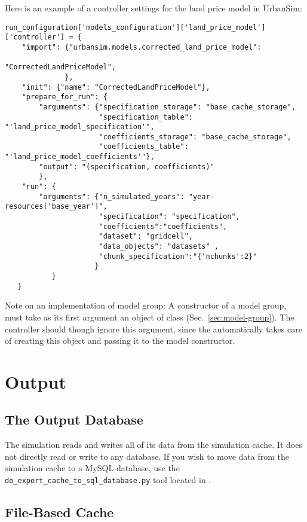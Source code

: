 Here is an example of a controller settings for the land price model in UrbanSim:
\modelsindex\datasetindex
\begin{verbatim}
run_configuration['models_configuration']['land_price_model']['controller'] = {
    "import": {"urbansim.models.corrected_land_price_model":
                                                "CorrectedLandPriceModel",
              },
    "init": {"name": "CorrectedLandPriceModel"},
    "prepare_for_run": {
        "arguments": {"specification_storage": "base_cache_storage",
                      "specification_table": "'land_price_model_specification'",
                      "coefficients_storage": "base_cache_storage",
                      "coefficients_table": "'land_price_model_coefficients'"},
        "output": "(specification, coefficients)"
        },
    "run": {
        "arguments": {"n_simulated_years": "year-resources['base_year']",
                      "specification": "specification",
                      "coefficients":"coefficients",
                      "dataset": "gridcell",
                      "data_objects": "datasets" ,
                      "chunk_specification":"{'nchunks':2}"
                     }
           }
   }
\end{verbatim}
Note on an implementation of model group: A constructor of 
a model group, must take as its first argument an object of class  (Sec.~\ref{sec:model-group}). 
The controller should though ignore this argument, since the  automatically takes care of creating this object 
and passing it to the model constructor.

\section{Output}
%
\subsection{The Output Database}

The simulation reads and writes all of its data from the simulation cache.  It 
does not directly read or write to any database. 
If you wish to move data from the simulation cache to a MySQL database, use the
\verb|do_export_cache_to_sql_database.py| tool located in
. 

\subsection{File-Based
Cache}\label{cache} \baseyearcacheindex\simulationcacheindex

